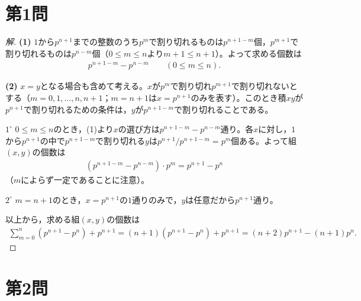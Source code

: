 \documentclass[../main.tex]{subfiles}
\begin{document}
\section*{第1問}

\begin{proof}[解]
  \textbf{(1)} $1$から$p^{n+1}$までの整数のうち$p^m$で割り切れるものは$p^{n+1-m}$個，$p^{m+1}$で割り切れるものは$p^{n-m}$個（$0\le m\le n$より$m+1\le n+1$）。よって求める個数は
  \begin{align*}
    p^{n+1-m}-p^{n-m}\qquad(0\le m\le n).
  \end{align*}

  \textbf{(2)} $x=y$となる場合も含めて考える。$x$が$p^m$で割り切れ$p^{m+1}$で割り切れないとする（$m=0,1,\dots,n,n+1$；$m=n+1$は$x=p^{n+1}$のみを表す）。このとき積$xy$が$p^{n+1}$で割り切れるための条件は，$y$が$p^{n+1-m}$で割り切れることである。

  $1^\circ$ $0\le m\le n$のとき，(1)より$x$の選び方は$p^{n+1-m}-p^{n-m}$通り。各$x$に対し，$1$から$p^{n+1}$の中で$p^{n+1-m}$で割り切れる$y$は$p^{n+1}/p^{n+1-m}=p^m$個ある。よって組$(x,y)$の個数は
  \begin{align*}
    (p^{n+1-m}-p^{n-m})\cdot p^m=p^{n+1}-p^n
  \end{align*}
  （$m$によらず一定であることに注意）。

  $2^\circ$ $m=n+1$のとき，$x=p^{n+1}$の$1$通りのみで，$y$は任意だから$p^{n+1}$通り。

  以上から，求める組$(x,y)$の個数は
  \begin{align*}
    \sum_{m=0}^n(p^{n+1}-p^n)+p^{n+1}=(n+1)(p^{n+1}-p^n)+p^{n+1}=(n+2)p^{n+1}-(n+1)p^n.
  \end{align*}
\end{proof}

\newpage

\section*{第2問}
\end{document}
